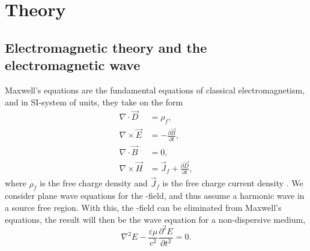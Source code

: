 \documentclass[../main.tex]{subfiles}
\begin{document}
\section{Theory}

\subsection{Electromagnetic theory and the electromagnetic wave}

Maxwell's equations are the fundamental equations of classical electromagnetism, and in SI-system of units, they take on the form 
\begin{subequations}
\begin{align}
    \nabla \cdot \vec{D} &= \rho_f, 
    \\ \nabla \times \vec{E} &= -\frac{\partial \vec{B}}{\partial t}, \\
    \nabla \cdot \vec{B} &= 0, \\
    \nabla \times \vec{H} &= \vec{J}_f + \frac{\partial \vec{D}}{\partial t},
\end{align}
\end{subequations}
where $\rho_f$ is the free charge density and $\vec{J}_f$ is the free charge current density \cite{Griffiths}. 
We consider plane wave equations for the -field, and thus assume a harmonic wave in a source free region. With this, the -field can be eliminated from Maxwell's equations, the result will then be the wave equation for a non-dispersive medium,
\begin{equation} \label{wavefunc}
    \nabla ^2E - \frac{\varepsilon\mu}{c^2} \frac{\partial^2E}{\partial t^2} = 0.
\end{equation}
\end{document}
